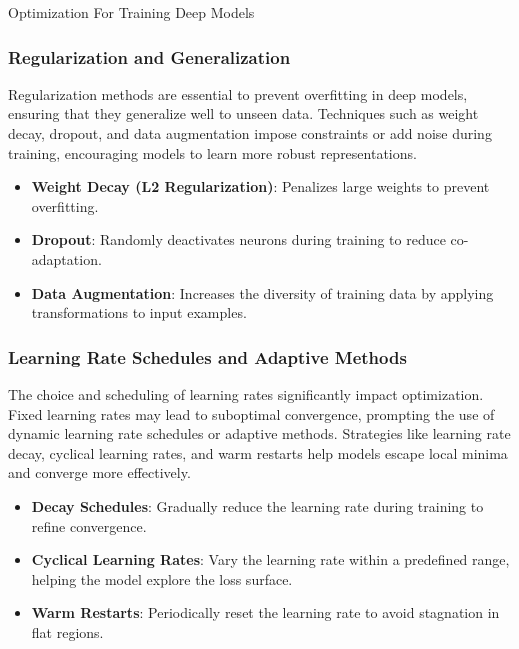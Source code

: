 \begin{notes}{Optimization For Training Deep Models}
    \subsubsection*{Regularization and Generalization}
    
    Regularization methods are essential to prevent overfitting in deep models, ensuring that they generalize well to unseen data. Techniques such as weight decay, dropout, and data augmentation impose constraints 
    or add noise during training, encouraging models to learn more robust representations.
    
    \begin{highlight}
        \begin{itemize}
            \item \textbf{Weight Decay (L2 Regularization)}: Penalizes large weights to prevent overfitting.
            \item \textbf{Dropout}: Randomly deactivates neurons during training to reduce co-adaptation.
            \item \textbf{Data Augmentation}: Increases the diversity of training data by applying transformations to input examples.
        \end{itemize}
    \end{highlight}
    
    \subsubsection*{Learning Rate Schedules and Adaptive Methods}
    
    The choice and scheduling of learning rates significantly impact optimization. Fixed learning rates may lead to suboptimal convergence, prompting the use of dynamic learning rate schedules or adaptive methods. 
    Strategies like learning rate decay, cyclical learning rates, and warm restarts help models escape local minima and converge more effectively.
    
    \begin{highlight}
        \begin{itemize}
            \item \textbf{Decay Schedules}: Gradually reduce the learning rate during training to refine convergence.
            \item \textbf{Cyclical Learning Rates}: Vary the learning rate within a predefined range, helping the model explore the loss surface.
            \item \textbf{Warm Restarts}: Periodically reset the learning rate to avoid stagnation in flat regions.
        \end{itemize}
    \end{highlight}
    

\end{notes}
